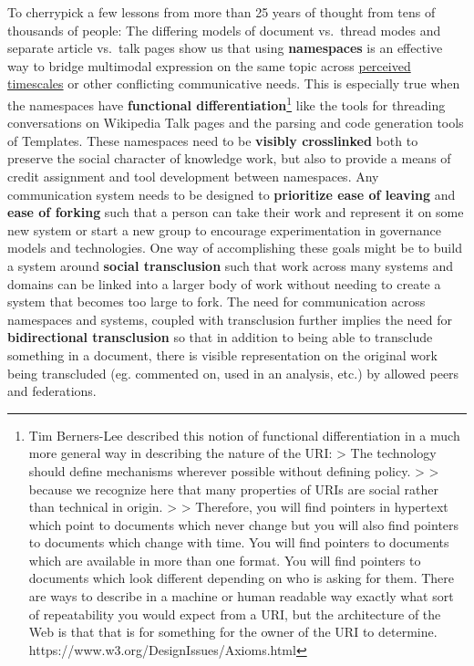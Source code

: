 To cherrypick a few lessons from more than 25 years of thought from tens
of thousands of people: The differing models of document vs.~thread
modes and separate article vs.~talk pages show us that using
\textbf{namespaces} is an effective way to bridge multimodal expression
on the same topic across
\href{https://communitywiki.org/wiki/TimeInWikis}{perceived timescales}
or other conflicting communicative needs. This is especially true when
the namespaces have \textbf{functional differentiation}\footnote{Tim
  Berners-Lee described this notion of functional differentiation in a
  much more general way in describing the nature of the URI:
  \textgreater{} The technology should define mechanisms wherever
  possible without defining policy. \textgreater{} \textgreater{}
  because we recognize here that many properties of URIs are social
  rather than technical in origin. \textgreater{} \textgreater{}
  Therefore, you will find pointers in hypertext which point to
  documents which never change but you will also find pointers to
  documents which change with time. You will find pointers to documents
  which are available in more than one format. You will find pointers to
  documents which look different depending on who is asking for them.
  There are ways to describe in a machine or human readable way exactly
  what sort of repeatability you would expect from a URI, but the
  architecture of the Web is that that is for something for the owner of
  the URI to determine. https://www.w3.org/DesignIssues/Axioms.html}
like the tools for threading conversations on Wikipedia Talk pages and
the parsing and code generation tools of Templates. These namespaces
need to be \textbf{visibly crosslinked} both to preserve the social
character of knowledge work, but also to provide a means of credit
assignment and tool development between namespaces. Any communication
system needs to be designed to \textbf{prioritize ease of leaving} and
\textbf{ease of forking} such that a person can take their work and
represent it on some new system or start a new group to encourage
experimentation in governance models and technologies. One way of
accomplishing these goals might be to build a system around
\textbf{social transclusion} such that work across many systems and
domains can be linked into a larger body of work without needing to
create a system that becomes too large to fork. The need for
communication across namespaces and systems, coupled with transclusion
further implies the need for \textbf{bidirectional transclusion} so that
in addition to being able to transclude something in a document, there
is visible representation on the original work being transcluded (eg.
commented on, used in an analysis, etc.) by allowed peers and
federations.


